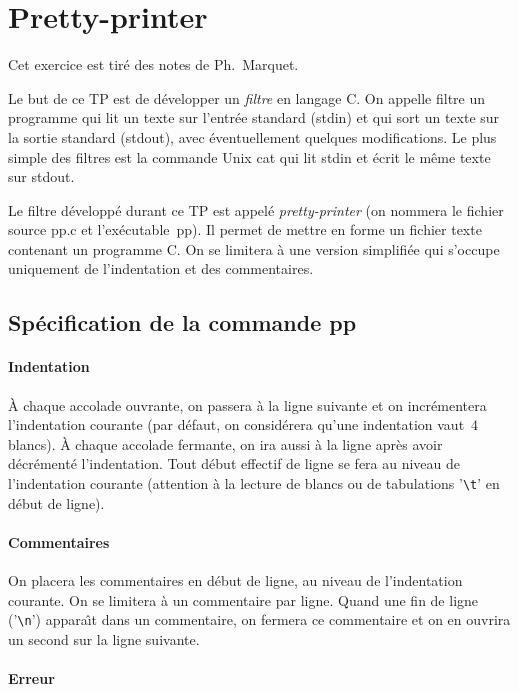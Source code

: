 
\section{Pretty-printer}
\label{sec:PrettyPrinter}
Cet exercice est tir\'e des notes de Ph.~Marquet.

Le but de ce TP est de d\'evelopper un \textit{filtre} en langage C. On
appelle filtre un programme qui lit un texte sur l'entr\'ee standard
(stdin) et qui sort un texte sur la sortie standard (stdout), avec
\'eventuellement quelques modifications. Le plus simple des filtres est
la commande Unix cat qui lit stdin et \'ecrit le m\^eme texte sur stdout.

Le filtre d\'evelopp\'e durant ce TP est appel\'e \textit{pretty-printer}
(on nommera le fichier source pp.c et l'ex\'ecutable~pp). Il permet de
mettre en forme un fichier texte contenant un programme C. On se
limitera \`a une version simplifi\'ee qui s'occupe uniquement de
l'indentation et des commentaires.


\subsection{Sp\'ecification de la commande pp}
\paragraph{Indentation}


\`A chaque accolade ouvrante, on passera \`a la ligne suivante et on
incr\'ementera l'indentation courante (par d\'efaut, on consid\'erera
qu'une indentation vaut~$4$ blancs). \`A chaque accolade fermante, on
ira aussi \`a la ligne apr\`es avoir d\'ecr\'ement\'e l'indentation.
Tout d\'ebut effectif de ligne se fera au niveau de l'indentation
courante (attention \`a la lecture de blancs ou de tabulations
'\verb?\t?' en d\'ebut de ligne).


\paragraph{Commentaires}

On placera les commentaires en d\'ebut de ligne, au niveau de
l'indentation courante. On se limitera \`a un commentaire par ligne.
Quand une fin de ligne ('\verb?\n?') appara\^\i{}t dans un commentaire, on
fermera ce commentaire et on en ouvrira un second sur la ligne
suivante.


\paragraph{Erreur}


